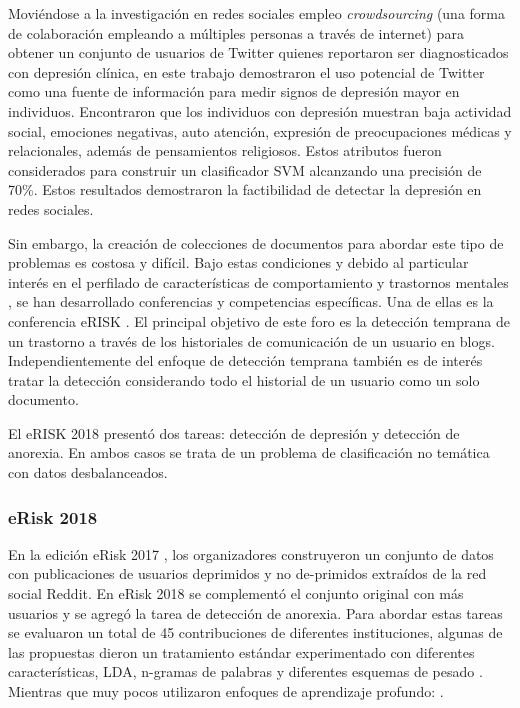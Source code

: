 Moviéndose a la investigación en redes sociales \citep{de2013predicting} empleo \textit{crowdsourcing} (una forma de colaboración empleando a múltiples personas a través de internet) para obtener un conjunto de usuarios de Twitter quienes reportaron ser diagnosticados con depresión clínica, en este trabajo demostraron el uso potencial de Twitter como una fuente de información para medir signos de depresión mayor en individuos. Encontraron que los individuos con depresión muestran baja actividad social, emociones negativas, auto atención, expresión de preocupaciones médicas y relacionales, además de pensamientos religiosos. Estos atributos fueron considerados para construir un clasificador SVM alcanzando una precisión de 70\%. Estos resultados demostraron la factibilidad de detectar la depresión en redes sociales. 

Sin embargo, la creación de colecciones de documentos para abordar este tipo de problemas es costosa y difícil. Bajo estas condiciones y debido al particular interés en el perfilado de características de comportamiento \citep{kumar2018aggression} y trastornos mentales  \citep{de2013predicting}, se han desarrollado conferencias y competencias específicas.
Una de ellas es la conferencia eRISK \citep{Losada2018}. El principal objetivo de este foro es la detección temprana de un trastorno a través de los historiales de comunicación de un usuario en blogs. Independientemente del enfoque de detección temprana también es de interés tratar la detección
considerando todo el historial de un usuario como un solo documento. 

El eRISK 2018 presentó dos tareas: detección de depresión y detección de anorexia. En ambos casos se trata de un problema de clasificación no temática con datos desbalanceados.


\subsubsection{eRisk 2018}

En la edición eRisk 2017 \citep{losada2017erisk, Losada2018}, los organizadores construyeron un conjunto de datos con publicaciones de usuarios deprimidos y no de-primidos extraídos de la red social Reddit. En eRisk 2018 se complementó el conjunto original con más usuarios y se agregó la tarea de detección de anorexia. Para abordar estas tareas se evaluaron un total de 45 contribuciones de diferentes instituciones, algunas de las propuestas dieron un tratamiento estándar experimentado con diferentes características, LDA, n-gramas de palabras y diferentes esquemas de pesado \citep{cacheda2018analysis, almeida2017detecting, ortega2018peimex}. Mientras que muy pocos utilizaron enfoques de aprendizaje profundo: \citep{trotzek2018word, wang2018neural, liu2018tua1}.


